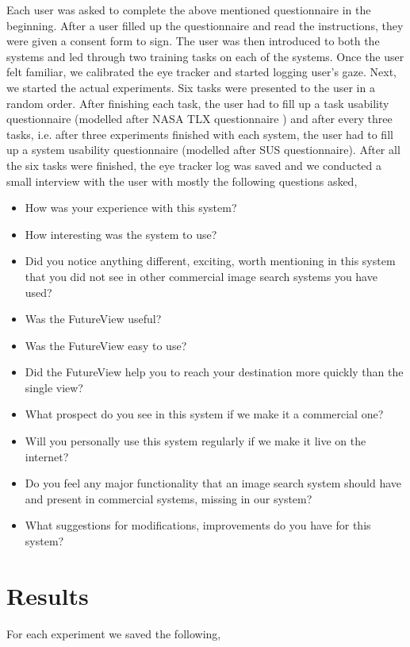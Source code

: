 \documentclass[english]{tktltiki}
\begin{document}
Each user was asked to complete the above mentioned questionnaire in the beginning. After a user filled up the questionnaire and read the instructions, they were given a consent form to sign. The user was then introduced to both the systems and led through two training tasks on each of the systems. Once the user felt familiar, we calibrated the eye tracker and started logging user's gaze. Next, we started the actual experiments. Six tasks were presented to the user in a random order. After finishing each task, the user had to fill up a task usability questionnaire (modelled after NASA TLX questionnaire \cite{NASA_TLX}) and after every three tasks, i.e. after three experiments finished with each system, the user had to fill up a system usability questionnaire (modelled after SUS questionnaire). After all the six tasks were finished, the eye tracker log was saved and we conducted a small interview with the user with mostly the following questions asked,

\begin{itemize}
	\item How was your experience with this system?
	\item How interesting was the system to use?
	\item Did you notice anything different, exciting, worth mentioning in this system that you did not see in other commercial image search systems you have used?
	\item Was the FutureView useful?
	\item Was the FutureView easy to use?
	\item Did the FutureView help you to reach your destination more quickly than the single view?
	\item What prospect do you see in this system if we make it a commercial one?
	\item Will you personally use this system regularly if we make it live on the internet?
	\item Do you feel any major functionality that an image search system should have and present in commercial systems, missing in our system?
	\item What suggestions for modifications, improvements do you have for this system?
\end{itemize}

\section{Results}

For each experiment we saved the following,
\end{document}
